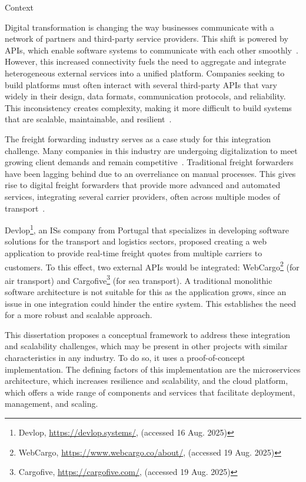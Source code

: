 \documentclass[12pt, reqno]{amsbook}
\makeatletter
\def\section{\@startsection{section}{1}%
      \z@{.5\linespacing\@plus.7\linespacing}{.25\linespacing}%
      {\normalfont\bfseries\flushleft}}
\theoremstyle{definition}
\theoremstyle{definition}
\numberwithin{section}{chapter}
\numberwithin{table}{chapter}
\numberwithin{figure}{chapter}
\makeatother
\begin{document}
\section{Context}
\label{Section:Context}

Digital transformation is changing the way businesses communicate with a network of partners and third-party service providers. This shift is powered by \acp{API}, which enable software systems to communicate with each other smoothly~\cite{Hunturu2023}. However, this increased connectivity fuels the need to aggregate and integrate heterogeneous external services into a unified platform. Companies seeking to build platforms must often interact with several third-party \acp{API} that vary widely in their design, data formats, communication protocols, and reliability. This inconsistency creates complexity, making it more difficult to build systems that are scalable, maintainable, and resilient~\cite{Huf2019}.

The freight forwarding industry serves as a case study for this integration challenge. Many companies in this industry are undergoing digitalization to meet growing client demands and remain competitive~\cite{Wang2021}. Traditional freight forwarders have been lagging behind due to an overreliance on manual processes. This gives rise to digital freight forwarders that provide more advanced and automated services, integrating several carrier providers, often across multiple modes of transport~\cite{Sullivan2021}.

Devlop\footnote{Devlop, \url{https://devlop.systems/}, (accessed 16 Aug. 2025)}, an \acp{IS} company from Portugal that specializes in developing software solutions for the transport and logistics sectors, proposed creating a web application to provide real-time freight quotes from multiple carriers to customers. To this effect, two external \acp{API} would be integrated: WebCargo\footnote{WebCargo, \url{https://www.webcargo.co/about/}, (accessed 19 Aug. 2025)} (for air transport) and Cargofive\footnote{Cargofive, \url{https://cargofive.com/}, (accessed 19 Aug. 2025)} (for sea transport). A traditional monolithic software architecture is not suitable for this as the application grows, since an issue in one integration could hinder the entire system. This establishes the need for a more robust and scalable approach.

This dissertation proposes a conceptual framework to address these integration and scalability challenges, which may be present in other projects with similar characteristics in any industry. To do so, it uses a proof-of-concept implementation. The defining factors of this implementation are the microservices architecture, which increases resilience and scalability, and the cloud platform, which offers a wide range of components and services that facilitate deployment, management, and scaling.
\end{document}
